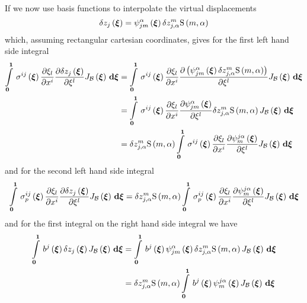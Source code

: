 If we now use basis functions to interpolate the virtual displacements \ie
\begin{equation}
  \delta \fnof{z_{j}}{\vectr{\xi}} = \idxgbfn{j}{m}{\alpha}{\vectr{\xi}}\delta z_{j,\alpha}^{m}\gsf{m}{\alpha}
\end{equation}
which, assuming rectangular cartesian coordinates, gives for the first left hand side integral
\begin{equation}
  \begin{split}
    \gint{\vectr{0}}{\vectr{1}}{\fnof{\sigma^{ij}}{\vectr{\xi}}\delby{\xi_{l}}{x^{i}}\delby{\delta
          \fnof{z_{j}}{\vectr{\xi}}}{\xi^{l}}\fnof{J_{\embedmanifold{B}}}{\vectr{\xi}}}{\vectr{\xi}}
    &= \gint{\vectr{0}}{\vectr{1}}{\fnof{\sigma^{ij}}{\vectr{\xi}}\delby{\xi_{l}}{x^{i}}\delby{
          \pbrac{\idxgbfn{j}{m}{\alpha}{\vectr{\xi}}\delta z_{j,\alpha}^{m}\gsf{m}{\alpha}}}{\xi^{l}}
      \fnof{J_{\embedmanifold{B}}}{\vectr{\xi}}}{\vectr{\xi}} \\
    &= \gint{\vectr{0}}{\vectr{1}}{\fnof{\sigma^{ij}}{\vectr{\xi}}\delby{\xi_{l}}{x^{i}}\delby{
          \idxgbfn{j}{m}{\alpha}{\vectr{\xi}}}{\xi^{l}}\delta z_{j,\alpha}^{m}\gsf{m}{\alpha}
      \fnof{J_{\embedmanifold{B}}}{\vectr{\xi}}}{\vectr{\xi}} \\
    &= \delta z_{j,\alpha}^{m}\gsf{m}{\alpha}
    \gint{\vectr{0}}{\vectr{1}}{\fnof{\sigma^{ij}}{\vectr{\xi}}\delby{\xi_{l}}{x^{i}}\delby{
          \gbfn{m}{j\alpha}{\vectr{\xi}}}{\xi^{l}}
      \fnof{J_{\embedmanifold{B}}}{\vectr{\xi}}}{\vectr{\xi}} 
  \end{split}
\end{equation}
and for the second left hand side integral
\begin{equation}
  \gint{\vectr{0}}{\vectr{1}}{\fnof{\sigma^{ij}_{p}}{\vectr{\xi}}\delby{\xi_{l}}{x^{i}}\delby{\delta
      \fnof{z_{j}}{\vectr{\xi}}}{\xi^{l}}\fnof{J_{\embedmanifold{B}}}{\vectr{\xi}}}{\vectr{\xi}}=
  \delta z_{j,\alpha}^{m}\gsf{m}{\alpha}
  \gint{\vectr{0}}{\vectr{1}}{\fnof{\sigma^{ij}_{p}}{\vectr{\xi}}\delby{\xi_{l}}{x^{i}}\delby{
      \gbfn{m}{j\alpha}{\vectr{\xi}}}{\xi^{l}}
    \fnof{J_{\embedmanifold{B}}}{\vectr{\xi}}}{\vectr{\xi}} 
\end{equation}
and for the first integral on the right hand side integral we have
\begin{equation}
  \begin{split}
    \gint{\vectr{0}}{\vectr{1}}{\fnof{b^{j}}{\vectr{\xi}}\delta
      \fnof{z_{j}}{\vectr{\xi}}\fnof{J_{\embedmanifold{B}}}{\vectr{\xi}}}{\vectr{\xi}}
    &= \gint{\vectr{0}}{\vectr{1}}{\fnof{b^{j}}{\vectr{\xi}}
      \idxgbfn{j}{m}{\alpha}{\vectr{\xi}}\delta
      z_{j,\alpha}^{m}\gsf{m}{\alpha}
      \fnof{J_{\embedmanifold{B}}}{\vectr{\xi}}}{\vectr{\xi}} \\
    &= \delta
    z_{j,\alpha}^{m}\gsf{m}{\alpha}\gint{\vectr{0}}{\vectr{1}}{\fnof{b^{j}}{\vectr{\xi}}\gbfn{m}{j\alpha}{\vectr{\xi}}
      \fnof{J_{\embedmanifold{B}}}{\vectr{\xi}}}{\vectr{\xi}}
  \end{split}
\end{equation}
